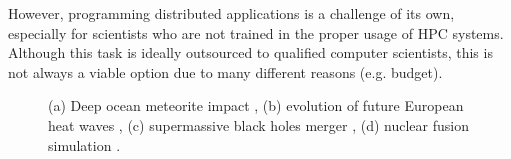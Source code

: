 \documentclass{juliacon}
\begin{document}
However, programming distributed applications is a challenge of its own, especially for scientists who are not trained in the proper usage of HPC systems.
Although this task is ideally outsourced to qualified computer scientists, this is not always a viable option due to many different reasons (e.g. budget).\vskip 6pt

\begin{figure}[h]
    \label{fig:intro_examples}
    \caption{(a) Deep ocean meteorite impact \cite{asteroid_vis_paper}, (b) evolution of future European heat waves \cite{TheJuly2019EuropeanHeatWaveinaWarmerClimateStorylineScenarioswithaCoupledModelUsingSpectralNudging}, (c) supermassive black holes merger \cite{blackhole_merger}, (d) nuclear fusion simulation \cite{in_situ_visualization_large_scale_fusion_simulation}.}
\end{figure}
\end{document}
